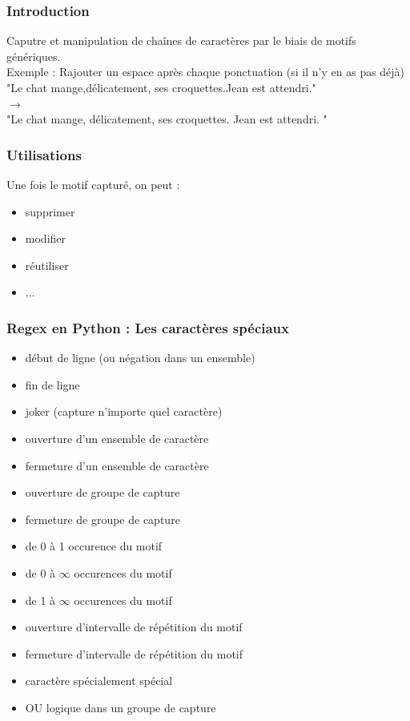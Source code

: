 \begin{frame}
  \frametitle{Introduction}
  Caputre et manipulation de chaînes de caractères par le biais de motifs génériques. \\
  \newline
  Exemple : Rajouter un espace après chaque ponctuation (si il n'y en as pas déjà) \\
  \newline
  "Le chat mange,délicatement, ses croquettes.Jean est attendri." \\
  $\rightarrow$ \\
  "Le chat mange, délicatement, ses croquettes. Jean est attendri. " \\
\end{frame}

\begin{frame}
  \frametitle{Utilisations}
  Une fois le motif capturé, on peut :
  \begin{itemize}
  \item supprimer
  \item modifier
  \item réutiliser
  \item ...
  \end{itemize}
\end{frame}

\begin{frame}
  \frametitle{Regex en Python : Les caractères spéciaux}
  \begin{itemize}
  \item \makebox[1cm][c]{\^{}} début de ligne (ou négation dans un ensemble)
  \item \makebox[1cm][c]{\$} fin de ligne
  \item {} joker (capture n'importe quel caractère) 
  \item \makebox[1cm][c]{[} ouverture d'un ensemble de caractère
  \item \makebox[1cm][c]{]} fermeture d'un ensemble de caractère
  \item \makebox[1cm][c]{(} ouverture de groupe de capture
  \item \makebox[1cm][c]{)} fermeture de groupe de capture
  \item {} de 0 à 1 occurence du motif
  \item \makebox[1cm][c]{*} de 0 à $\infty$ occurences du motif
  \item \makebox[1cm][c]{+} de 1 à $\infty$ occurences du motif
  \item \makebox[1cm][c]{\{} ouverture d'intervalle de répétition du motif
  \item \makebox[1cm][c]{\}} fermeture d'intervalle de répétition du motif
  \item \makebox[1cm][c]{\textbackslash} caractère spécialement spécial
  \item \makebox[1cm][c]{\textbar} OU logique dans un groupe de capture
  \end{itemize}
\end{frame}

